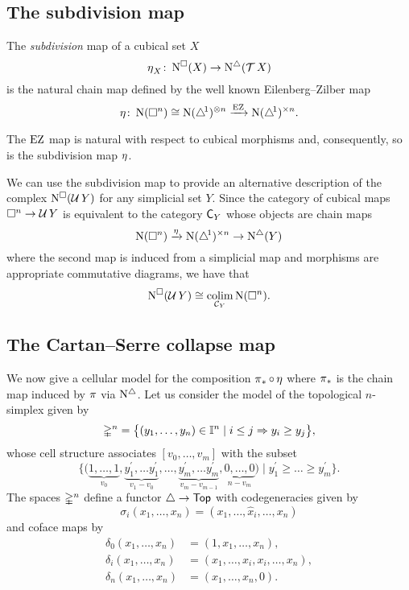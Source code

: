 \subsection{The subdivision map}

The \textit{subdivision} map of a cubical set $X$
\[
\operatorname{\eta}_X \colon \operatorname{N^{\square}}(X) \to \operatorname{N^{\triangle}}(\operatorname{\mathcal{T}} X)
\]
is the natural chain map defined by the well known Eilenberg--Zilber map
\[
\operatorname{\eta} \colon \operatorname{N}(\square^n) \cong \operatorname{N}(\triangle^{\!1})^{\otimes n} \xrightarrow{\operatorname{EZ}} \operatorname{N} (\triangle^{\!1})^{\times n}.
\]

The $\operatorname{EZ}$ map is natural with respect to cubical morphisms and, consequently, so is the subdivision map $\operatorname{\eta}$.

We can use the subdivision map to provide an alternative description of the complex $\operatorname{N^{\square}}(\operatorname{\mathcal{U}} Y)$ for any simplicial set $Y$.
Since the category of cubical maps $\square^n \to \operatorname{\mathcal{U}} Y$ is equivalent to the category $\mathsf{C}_Y$ whose objects are chain maps
\[
\operatorname{N}(\square^n) \xrightarrow{\operatorname{\eta}} \operatorname{N} (\triangle^{\!1})^{\times n} \to \operatorname{N^{\triangle}}(Y)
\]
where the second map is induced from a simplicial map
and morphisms are appropriate commutative diagrams, we have that
\begin{equation} \label{e:alternative description of NUY}
\operatorname{N^{\square}}(\operatorname{\mathcal{U}} Y) \cong \operatorname*{colim}_{\mathcal{C}_Y} \operatorname{N}(\square^n).
\end{equation}

\subsection{The Cartan--Serre collapse map} \label{ss:cs collapse map}

We now give a cellular model for the composition $\operatorname{\pi}_\ast \circ \operatorname{\eta}$ where $\operatorname{\pi}_\ast$ is the chain map induced by $\operatorname{\pi}$ via $\operatorname{N^{\triangle}}$.
Let us consider the model of the topological $n$-simplex given by
\[
\mathbb{\Delta}^n = \big\{ (y_1, \dots, y_n) \in \mathbb{I}^n \mid i \leq j \Rightarrow y_i \geq y_j \big\},
\]
whose cell structure associates $[v_0, \dots, v_m]$ with the subset
\[
\Big\{ \big( \underbrace{1, \dots, 1}_{v_0}, \underbrace{y^\prime_1, \dots y^\prime_1}_{v_1-v_0}, \dots, \underbrace{y^\prime_m, \dots y^\prime_m}_{v_m-v_{m-1}}, \underbrace{0, \dots, 0}_{n-v_m} \big) \mid y^\prime_1 \geq \dots \geq y^\prime_m \Big\}.
\]
The spaces $\mathbb{\Delta}^n$ define a functor $\triangle \to \mathsf{Top}$ with codegeneracies given by
\[
\sigma_i(x_1, \dots, x_n) = (x_1, \dots, \widehat x_i, \dots, x_n)
\]
and coface maps by
\begin{align*}
\delta_0(x_1, \dots, x_n) &= (1, x_1, \dots, x_n), \\
\delta_i(x_1, \dots, x_n) &= (x_1, \dots, x_i, x_i, \dots, x_n), \\
\delta_n(x_1, \dots, x_n) &= (x_1, \dots, x_n, 0).
\end{align*}

